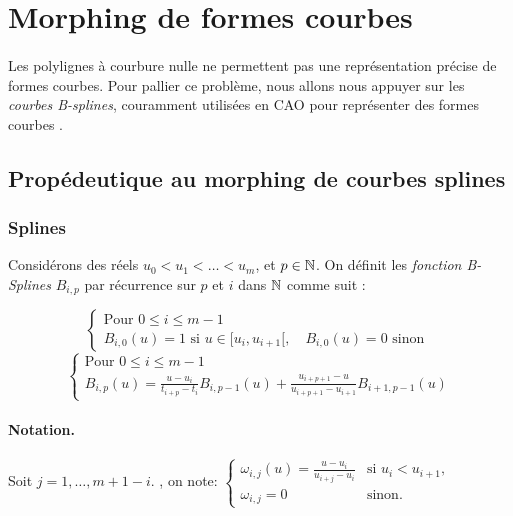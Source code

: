 \section{Morphing de formes courbes}
\label{sec:morphing_courbes}

\paragraph{} Les polylignes à courbure nulle ne permettent pas une représentation précise de formes courbes. 
Pour pallier ce problème, nous allons nous appuyer sur les \emph{courbes B-splines}, couramment utilisées en CAO pour représenter des formes courbes \cite{pansu2004bsplines}.


\subsection{Propédeutique au morphing de courbes splines}

\subsubsection{Splines}

\begin{definition}
    Considérons des réels $u_0 < u_1 < \ldots < u_m$, et $p\in\mathbb{N}$.
    On définit les \emph{fonction B-Splines} $B_{i, p}$ par récurrence sur $p$ et $i$ dans $\mathbb{N}$ comme suit :
    
    \begin{equation}
        \begin{cases}
            \text{Pour } 0 \leq i \leq m-1 \\
            B_{i, 0}(u)=1 \text{ si } u \in[u_i, u_{i+1}[, \quad B_{i, 0}(u)=0 \text{ sinon }
        \end{cases}
    \end{equation}
    \begin{equation}
        \begin{cases}
            \text{Pour } 0 \leq i \leq m-1 \\
            B_{i, p}(u)=\frac{u-u_i}{t_{i+p}-t_i}B_{i, p-1}(u)+\frac{u_{i+p+1}-u}{u_{i+p+1}-u_{i+1}}B_{i+1, p-1}(u)
        \end{cases}
    \end{equation}
    
\end{definition}
\paragraph{Notation.} Soit $j=1, \ldots, m+1-i$. , on note:
$
\begin{cases}
    \omega_{i, j}(u)=\frac{u-u_i}{u_{i+j}-u_i} & \text{si } u_i<u_{i+1},\\
    \omega_{i, j}=0 & \text{sinon}.
\end{cases}$
\vspace*{0.5cm}

